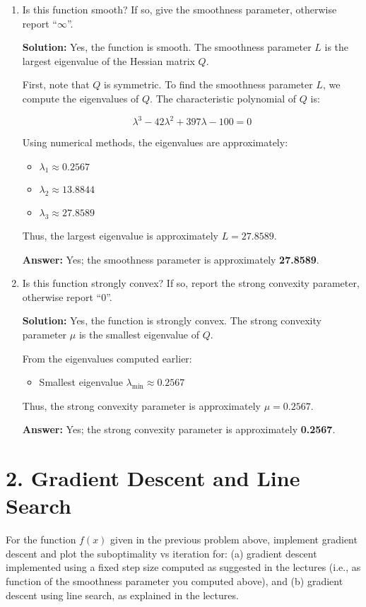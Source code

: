 \documentclass{article}
\begin{document}
\begin{enumerate}[label=(\alph*)]
\item Is this function smooth? If so, give the smoothness parameter, otherwise report ``$\infty$''.

\textbf{Solution:} Yes, the function is smooth. The smoothness parameter $L$ is the largest eigenvalue of the Hessian matrix $Q$.

First, note that $Q$ is symmetric. To find the smoothness parameter $L$, we compute the eigenvalues of $Q$. The characteristic polynomial of $Q$ is:

\[
\lambda^3 - 42\lambda^2 + 397\lambda - 100 = 0
\]

Using numerical methods, the eigenvalues are approximately:
\begin{itemize}
\item $\lambda_1 \approx 0.2567$
\item $\lambda_2 \approx 13.8844$
\item $\lambda_3 \approx 27.8589$
\end{itemize}

Thus, the largest eigenvalue is approximately $L = 27.8589$.

\textbf{Answer:} Yes; the smoothness parameter is approximately \textbf{27.8589}.

\item Is this function strongly convex? If so, report the strong convexity parameter, otherwise report ``0''.

\textbf{Solution:} Yes, the function is strongly convex. The strong convexity parameter $\mu$ is the smallest eigenvalue of $Q$.

From the eigenvalues computed earlier:
\begin{itemize}
\item Smallest eigenvalue $\lambda_{\text{min}} \approx 0.2567$
\end{itemize}

Thus, the strong convexity parameter is approximately $\mu = 0.2567$.

\textbf{Answer:} Yes; the strong convexity parameter is approximately \textbf{0.2567}.

\end{enumerate}

\section*{2. Gradient Descent and Line Search} For the function $f(x)$ given in the previous problem above, implement gradient descent and plot the suboptimality vs iteration for: (a) gradient descent implemented using a fixed step size computed as suggested in the lectures (i.e., as function of the smoothness parameter you computed above), and (b) gradient descent using line search, as explained in the lectures.
\end{document}
